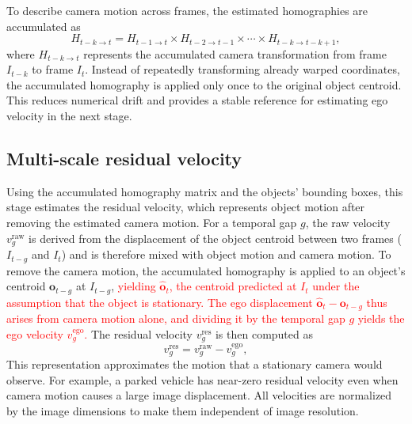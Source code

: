\documentclass{article}
\begin{document}
To describe camera motion across frames, the estimated homographies are accumulated as
\begin{equation}
  H_{t-k \to t} = H_{t-1 \to t} \times H_{t-2 \to t-1} \times \cdots \times H_{t-k \to t-k+1},
  \label{eq:cumulative}
\end{equation}
where $H_{t-k \to t}$ represents the accumulated camera transformation from frame $I_{t-k}$ to frame $I_t$. Instead of repeatedly transforming already warped coordinates, the accumulated homography is applied only once to the original object centroid. This reduces numerical drift and provides a stable reference for estimating ego velocity in the next stage.

\subsection{Multi-scale residual velocity}
\label{sec:residual}
Using the accumulated homography matrix and the objects' bounding boxes, this stage estimates the residual velocity, which represents object motion after removing the estimated camera motion. For a temporal gap $g$, the raw velocity $v^{\mathrm{raw}}_{g}$ is derived from the displacement of the object centroid between two frames ($I_{t-g}$ and $I_{t}$) and is therefore mixed with object motion and camera motion. To remove the camera motion, the accumulated homography is applied to an object's centroid $\boldsymbol{o}_{t-g}$ at $I_{t-g}$, \textcolor{red}{yielding $\hat{\boldsymbol{o}}_{t}$, the centroid predicted at $I_{t}$ under the assumption that the object is stationary. The ego displacement $\hat{\boldsymbol{o}}_{t}-\boldsymbol{o}_{t-g}$ thus arises from camera motion alone, and dividing it by the temporal gap $g$ yields the ego velocity $v^{\mathrm{ego}}_{g}$.} The residual velocity $v^{\mathrm{res}}_{g}$ is then computed as
\begin{equation}
  v^{\mathrm{res}}_{g} = v^{\mathrm{raw}}_{g} - v^{\mathrm{ego}}_{g},
  \label{eq:residual}
\end{equation}
This representation approximates the motion that a stationary camera would observe. For example, a parked vehicle has near-zero residual velocity even when camera motion causes a large image displacement. All velocities are normalized by the image dimensions to make them independent of image resolution.
\end{document}
